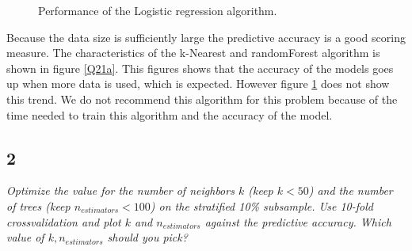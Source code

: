 \documentclass[a4paper,12pt]{article}
\begin{document}
{\begin{figure}[H]
\hfill
{}
\hfill
\caption{Performance of the Logistic regression algorithm.}
\label{Q21b}
\end{figure}

\textnormal{Because the data size is sufficiently large the predictive accuracy is a good scoring measure. The characteristics of the k-Nearest and randomForest algorithm is shown in figure \ref{Q21a}. This figures shows that the accuracy of the models goes up when more data is used, which is expected. However figure \ref{Q21b} does not show this trend. We do not recommend this algorithm for this problem because of the time needed to train this algorithm and the accuracy of the model.}


\subsection{2}
{\it Optimize the value for the number of neighbors $k$ (keep $k < 50$) and the number of trees
(keep $n_{estimators} < 100$) on the stratified 10\% subsample. Use 10-fold crossvalidation and plot $k$ and $n_{estimators}$ against the predictive accuracy. Which value of $k, n_{estimators}$ should you pick?}\\

}
\end{document}
